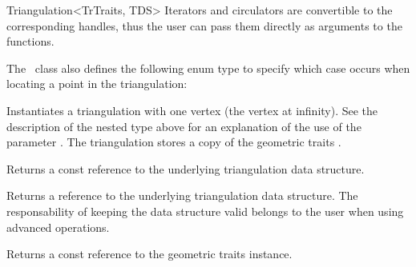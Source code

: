 \begin{ccRefClass}{Triangulation<TrTraits, TDS>}
Iterators and circulators are convertible to the corresponding handles, thus
the user can pass them directly as arguments to the functions.

\ccGlue{}

\ccGlue{}

\ccGlue{}

The \ccRefName\ class also defines the following enum type to specify
which case occurs when locating a point in the triangulation:


\ccCreation
{}

{Instantiates a triangulation with one vertex (the vertex at infinity). See the
description of the nested type  above for an
explanation of the use of the parameter . The triangulation stores a copy
of the geometric traits .}


%
{Returns a const reference to the underlying triangulation data structure.}

\begin{ccAdvanced}
%
{Returns a %
reference to the underlying triangulation data structure.
The responsability of keeping the data structure valid belongs to the
user when using advanced operations.}
\end{ccAdvanced}

%
{Returns a const reference to the geometric traits instance.}


\end{ccRefClass}
